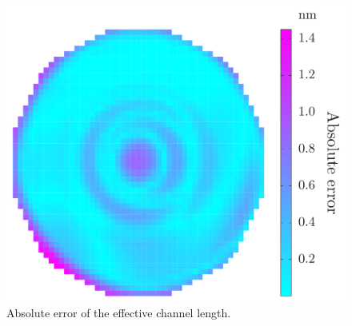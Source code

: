 \begin{figure}
  \centering
  \includegraphics[width=0.6\linewidth]{include/figures/wafer-qoi-error.pdf}
  \caption{Absolute error of the effective channel length.}
  \vspace{-1.5em}
\end{figure}
